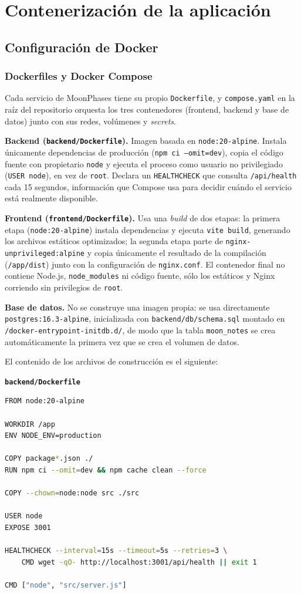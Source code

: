 \chapter{Contenerización de la aplicación}

\section{Configuración de Docker}

\subsection{Dockerfiles y Docker Compose}
Cada servicio de MoonPhases tiene su propio \texttt{Dockerfile}, y \texttt{compose.yaml} en la raíz del repositorio orquesta los tres contenedores (frontend, backend y base de datos) junto con sus redes, volúmenes y \emph{secrets}.

\textbf{Backend (\texttt{backend/Dockerfile}).} Imagen basada en \texttt{node:20-alpine}. Instala únicamente dependencias de producción (\texttt{npm ci --omit=dev}), copia el código fuente con propietario \texttt{node} y ejecuta el proceso como usuario no privilegiado (\texttt{USER node}), en vez de \texttt{root}. Declara un \texttt{HEALTHCHECK} que consulta \texttt{/api/health} cada 15 segundos, información que Compose usa para decidir cuándo el servicio está realmente disponible.

\textbf{Frontend (\texttt{frontend/Dockerfile}).} Usa una \emph{build} de dos etapas: la primera etapa (\texttt{node:20-alpine}) instala dependencias y ejecuta \texttt{vite build}, generando los archivos estáticos optimizados; la segunda etapa parte de \texttt{nginx-unprivileged:alpine} y copia únicamente el resultado de la compilación (\texttt{/app/dist}) junto con la configuración de \texttt{nginx.conf}. El contenedor final no contiene Node.js, \texttt{node\_modules} ni código fuente, sólo los estáticos y Nginx corriendo sin privilegios de \texttt{root}.

\textbf{Base de datos.} No se construye una imagen propia: se usa directamente \texttt{postgres:16.3-alpine}, inicializada con \texttt{backend/db/schema.sql} montado en \texttt{/docker-entrypoint-initdb.d/}, de modo que la tabla \texttt{moon\_notes} se crea automáticamente la primera vez que se crea el volumen de datos.

El contenido de los archivos de construcción es el siguiente:

\textbf{\texttt{backend/Dockerfile}}
\begin{lstlisting}[language=bash]
FROM node:20-alpine

WORKDIR /app
ENV NODE_ENV=production

COPY package*.json ./
RUN npm ci --omit=dev && npm cache clean --force

COPY --chown=node:node src ./src

USER node
EXPOSE 3001

HEALTHCHECK --interval=15s --timeout=5s --retries=3 \
    CMD wget -qO- http://localhost:3001/api/health || exit 1

CMD ["node", "src/server.js"]
\end{lstlisting}

